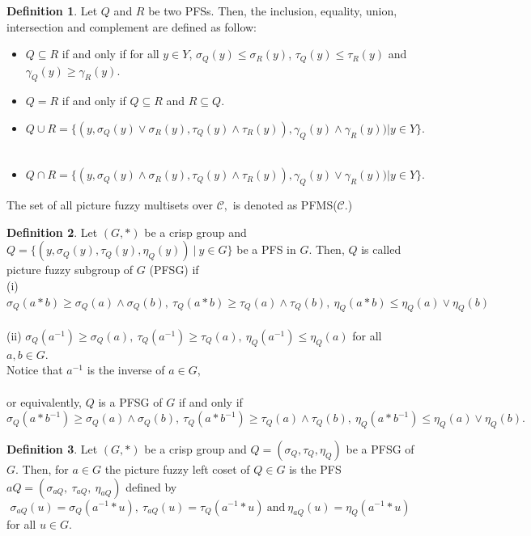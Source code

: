 \documentclass[12pt,letterpaper]{amsart}
\theoremstyle{plain}
\theoremstyle{definition}
\newtheorem{definition}{Definition}[section]
\numberwithin{equation}{section}
\begin{document}
\begin{definition} \cite{ck}
Let $Q$ and $R$ be two PFSs. Then, the inclusion, equality, union, intersection and complement are defined as follow:
\begin{itemize}
\item[(i)] $Q \subseteq R$ if and only if for all $y \in Y$, $\sigma_{Q}(y) \leq \sigma_{R}(y)$, $\tau_{Q}(y) \leq \tau_{R}(y)$ and $\gamma_{Q}(y) \geq \gamma_{R}(y).$ \ \\
\item[(ii)] $Q = R$ if and only if $Q \subseteq R$ and $R \subseteq Q.$ \ \\
\item[(iii)] $Q \cup R = \lbrace ( y, \sigma_{Q}(y) \vee \sigma_R(y), \tau_Q(y) \wedge \tau_R(y)), \gamma_Q(y) \wedge \gamma_R(y)) | y \in Y \rbrace.$ \ \\
\item[(iv)] $Q \cap R = \lbrace ( y, \sigma_{Q}(y) \wedge \sigma_R(y), \tau_Q(y) \wedge \tau_R(y)), \gamma_Q(y) \vee \gamma_R(y)) | y \in Y \rbrace.$
\end{itemize}
\end{definition}
\noindent The set of all picture fuzzy multisets over $\mathcal{C},$ is denoted as PFMS($\mathcal{C}.$)

\begin{definition}\cite{dp}
Let $(G, \ast)$ be a crisp group and $Q = \lbrace (y, \sigma_{Q}(y), \tau_Q(y), \eta_Q(y))~|~ y \in G \rbrace$ be a PFS in $G$. Then, $Q$ is called picture fuzzy subgroup of $G$ (PFSG) if\\ (i)~ $\sigma_Q(a \ast b) \geq \sigma_Q(a) \wedge \sigma_Q(b),~ \tau_Q(a \ast b) \geq \tau_Q(a) \wedge \tau_Q(b),~ \eta_Q(a \ast b) \leq \eta_Q(a) \vee \eta_Q(b) $\\ \ \\ (ii) $\sigma_Q(a^{-1}) \geq \sigma_Q(a),~ \tau_Q(a^{-1}) \geq \tau_Q(a),~ \eta_Q(a^{-1}) \leq \eta_Q(a)$ for all $a, b \in G$.\\ Notice that $a^{-1}$ is the inverse of $a \in G$,\\ \ \\ or equivalently, $Q$ is a PFSG of $G$ if and only if\\ $\sigma_Q(a \ast b^{-1}) \geq \sigma_Q(a) \wedge \sigma_Q(b),~ \tau_Q(a \ast b^{-1}) \geq \tau_Q(a) \wedge \tau_Q(b),~ \eta_Q(a \ast b^{-1}) \leq \eta_Q(a) \vee \eta_Q(b) .$
\end{definition}

\begin{definition} \cite{dp}
Let $(G, \ast)$ be a crisp group and $Q = (\sigma_{Q}, \tau_Q, \eta_Q)$ be a PFSG of $G$. Then, for $a \in G$ the picture fuzzy left coset of $Q \in G$ is the PFS $aQ = (\sigma_{aQ},~ \tau_{aQ},~ \eta_{aQ})$ defined by $$\sigma_{aQ}(u) = \sigma_{Q} (a^{-1} \ast u),~ \tau_{aQ}(u) = \tau_{Q} (a^{-1} \ast u)~ \text{and}~  \eta_{aQ}(u) = \eta_{Q} (a^{-1} \ast u)$$ for all $ u \in G$.
\end{definition}
\end{document}
